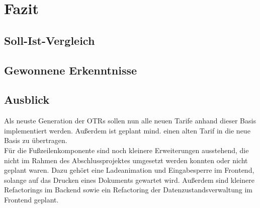 \newpage
\section{Fazit}
\label{fazit}

\subsection{Soll-Ist-Vergleich}
\label{sollIstVgl}

\subsection{Gewonnene Erkenntnisse}
\label{erkenntnisse}

\subsection{Ausblick}
\label{ausblick}
Als neuste Generation der \ac{OTR}s sollen nun alle neuen Tarife anhand dieser Basis implementiert werden. Außerdem ist geplant mind. einen alten Tarif in die neue Basis zu übertragen.\\
Für die Fußzeilenkomponente sind noch kleinere Erweiterungen ausstehend, die nicht im Rahmen des Abschlussprojektes umgesetzt werden konnten oder nicht geplant waren. Dazu gehört eine Ladeanimation und Eingabesperre im Frontend, solange auf das Drucken eines Dokuments gewartet wird. Außerdem sind kleinere Refactorings im Backend sowie ein Refactoring der Datenzustandsverwaltung im Frontend geplant.